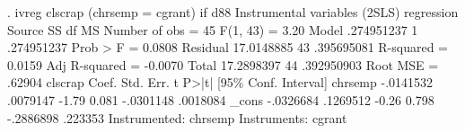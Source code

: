 . ivreg clscrap (chrsemp = cgrant) if d88
{\smallskip}
Instrumental variables (2SLS) regression
{\smallskip}
      Source {\VBAR}       SS           df       MS      Number of obs   =        45
   F(1, 43)        =      3.20
       Model {\VBAR}  .274951237         1  .274951237   Prob > F        =    0.0808
    Residual {\VBAR}  17.0148885        43  .395695081   R-squared       =    0.0159
   Adj R-squared   =   -0.0070
       Total {\VBAR}  17.2898397        44  .392950903   Root MSE        =    .62904
{\smallskip}
     clscrap {\VBAR}      Coef.   Std. Err.      t    P>|t|     [95\% Conf. Interval]
     chrsemp {\VBAR}  -.0141532   .0079147    -1.79   0.081    -.0301148    .0018084
       _cons {\VBAR}  -.0326684   .1269512    -0.26   0.798    -.2886898     .223353
Instrumented:  chrsemp
Instruments:   cgrant
{\smallskip}
